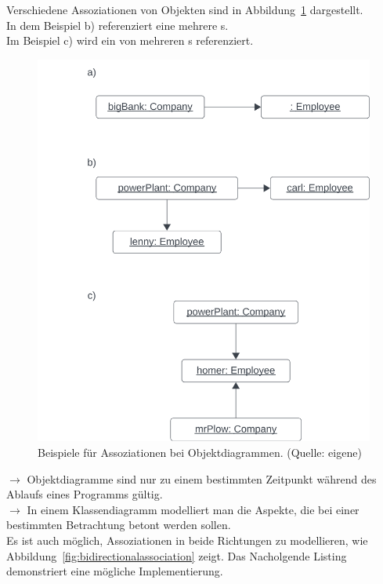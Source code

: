 \noindent
Verschiedene Assoziationen von Objekten sind in Abbildung~\ref{fig:objectassociations} dargestellt.\\
In dem Beispiel b) referenziert eine  mehrere s.\\
Im Beispiel c) wird ein  von mehreren s referenziert.\\

\begin{figure}
    \centering
    \includegraphics[scale=0.5]{chapters/fopt3/img/objectassociations}
    \caption{Beispiele für Assoziationen bei Objektdiagrammen. (Quelle: eigene)}
    \label{fig:objectassociations}
\end{figure}

\noindent
$\rightarrow$ Objektdiagramme sind nur zu einem bestimmten Zeitpunkt während des Ablaufs eines Programms gültig.\\

\noindent
$\rightarrow$ In einem Klassendiagramm modelliert man die Aspekte, die bei einer bestimmten Betrachtung betont werden sollen.\\

\noindent
Es ist auch möglich, Assoziationen in beide Richtungen zu modellieren, wie Abbildung~\ref{fig:bidirectionalassociation} zeigt. Das Nacholgende Listing demonstriert eine mögliche Implementierung.

